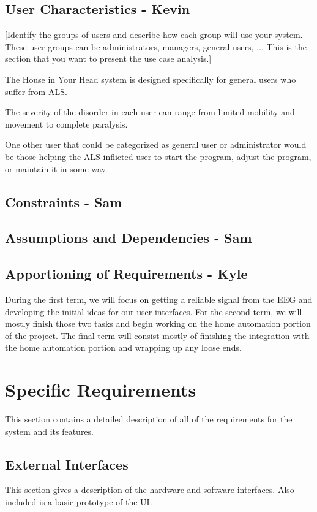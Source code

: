 \documentclass{article}
\begin{document}
\subsection{User Characteristics - Kevin}

[Identify the groups of users and describe how each group will use your system. These user groups
can be administrators, managers, general users, ... This is the section that you want to present the use 
case analysis.]

The House in Your Head system is designed specifically for general users who suffer from ALS. 

The severity of the disorder in each user can range from limited mobility and movement to complete 
paralysis. 

One other user that could be categorized as general user or administrator would be those helping the 
ALS inflicted user to start the program, adjust the program, or maintain it in some way.

\subsection{Constraints - Sam}

\subsection{Assumptions and Dependencies - Sam}

\subsection{Apportioning of Requirements - Kyle}
During the first term, we will focus on getting a reliable signal from the EEG and developing the initial ideas for our user interfaces. For the second term, we will mostly finish those two tasks and begin working on the home automation portion of the project. The final term will consist mostly of finishing the integration with the home automation portion and wrapping up any loose ends.
\newpage

\section{Specific Requirements}
This section contains a detailed description of all of the requirements for the system and its features. 

\subsection{External Interfaces}
This section gives a description of the hardware and software interfaces. Also included is a basic prototype of the UI.
\end{document}
